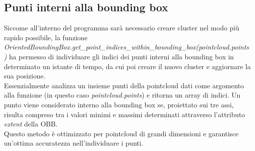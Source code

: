 \documentclass[italian]{report}
\begin{document}
\subsection{Punti interni alla bounding box}
Siccome all'interno del programma sarà necessario creare cluster nel modo più rapido possibile, la funzione\\ \textit{OrientedBoundingBox.get\_point\_indices\_within\_bounding\_box(pointcloud.points)} ha permesso di individuare gli indici dei punti interni alla bounding box in determinato un istante di tempo, da cui poi creare il nuovo cluster e aggiornare la sua posizione.\\ 
Essenzialmente analizza un insieme punti della pointcloud dati come argomento alla funzione (in questo caso \textit{pointcloud.points}) e ritorna un array di indici. Un punto viene considerato interno alla bounding box se, proiettato sui tre assi, risulta compreso tra i valori minimi e massimi determinati attraverso l'attributo \textit{extent} della OBB.\\
Questo metodo è ottimizzato per pointcloud di grandi dimensioni e garantisce un'ottima accuratezza nell'individuare i punti.
\end{document}
